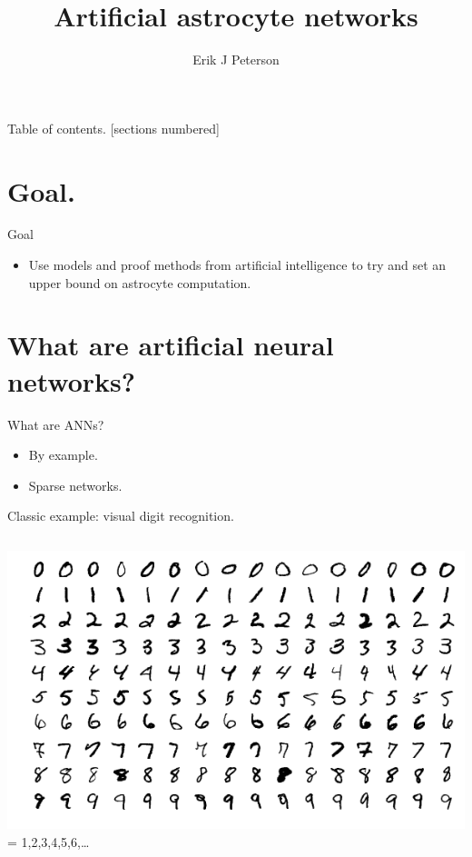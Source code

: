 \documentclass[10pt]{beamer}
\title{Artificial astrocyte networks}
\date{}
\author{Erik J Peterson}
\institute{CoAxLab\\Carnegie Mellon University}
\begin{document}
\maketitle

\begin{frame}{Table of contents.}
  [sections numbered]
  \tableofcontents%
\end{frame}

\section[]{Goal.}
\begin{frame}[fragile]{Goal}
\begin{itemize}
    \item Use models and proof methods from artificial intelligence to try and set an \alert{upper bound} on astrocyte computation.
\end{itemize}
\end{frame}

\section[ANNs]{What are artificial neural networks?}
\begin{frame}[fragile]{What are ANNs?}
\begin{itemize}
\item By example.
\item Sparse networks.
\end{itemize}
\end{frame}

\begin{frame}[fragile]{Classic example: visual digit recognition.}
\begin{columns}
\centering
\includegraphics[scale=0.25]{images/minst.png}
\centering
 = 1,2,3,4,5,6,\ldots
\end{columns}
\end{frame}
\end{document}
